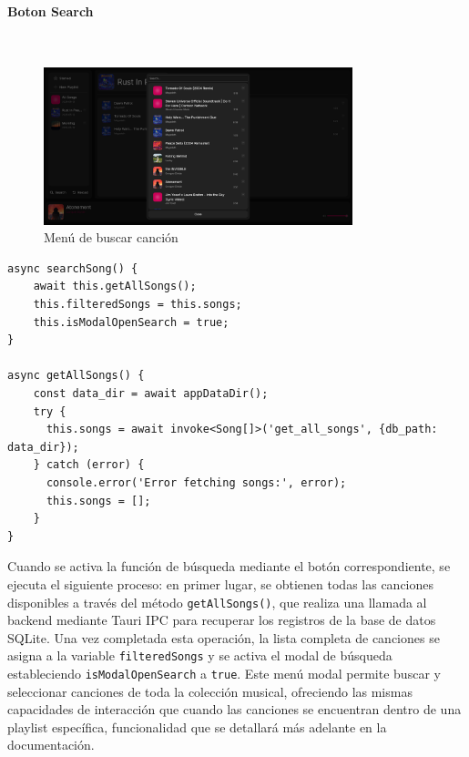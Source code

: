 \documentclass[11pt, a4paper]{article}
\begin{document}
                \paragraph{Boton Search}

                ‎ \\

                \begin{figure}[H]
                    \centering
                    \includegraphics[width=0.8\textwidth]{media/screenshots/search_song.png}
                    \caption{Menú de buscar canción}
                    \label{fig:buscar}
                \end{figure}

                \begin{lstlisting}[caption={searchSong()}]
async searchSong() {
    await this.getAllSongs();
    this.filteredSongs = this.songs;
    this.isModalOpenSearch = true;
}

async getAllSongs() {
    const data_dir = await appDataDir();
    try {
      this.songs = await invoke<Song[]>('get_all_songs', {db_path: data_dir});
    } catch (error) {
      console.error('Error fetching songs:', error);
      this.songs = [];
    }
}
                \end{lstlisting}

                Cuando se activa la función de búsqueda mediante el botón correspondiente, se ejecuta el siguiente proceso: en primer lugar, se obtienen todas las canciones disponibles a través del método \texttt{getAllSongs()}, que realiza una llamada al backend mediante Tauri IPC para recuperar los registros de la base de datos SQLite. Una vez completada esta operación, la lista completa de canciones se asigna a la variable \texttt{filteredSongs} y se activa el modal de búsqueda estableciendo \texttt{isModalOpenSearch} a \texttt{true}. Este menú modal permite buscar y seleccionar canciones de toda la colección musical, ofreciendo las mismas capacidades de interacción que cuando las canciones se encuentran dentro de una playlist específica, funcionalidad que se detallará más adelante en la documentación.
\end{document}
